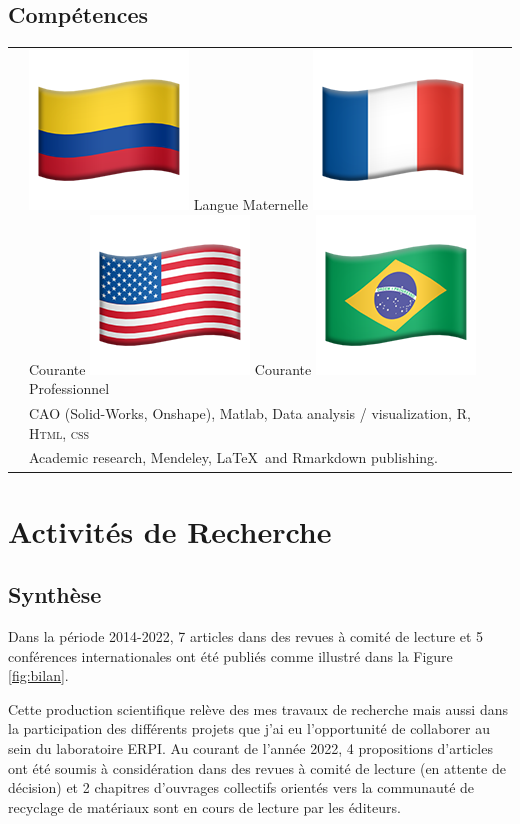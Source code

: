 \documentclass[
  12pt,
  oneside]{book}
\begin{document}
\hypertarget{compuxe9tences}{%
\section{Compétences}\label{compuxe9tences}}

\extrarowsep=3pt
\begin{tabu} to \linewidth {X[0.1,l] X[2,l]}

  & 
\includegraphics[width=2ex]{Figures/icons/flag-colombia.png} Langue Maternelle\quad 
\includegraphics[width=2ex]{Figures/icons/flag-france.png} Courante  \quad\includegraphics[width=2ex]{Figures/icons/flag-usa.png} Courante  \quad
\includegraphics[width=2ex]{Figures/icons/flag-brazil.png} Professionnel \\[5pt] 


  & CAO (Solid-Works, Onshape), Matlab,  Data analysis / visualization, R, \textsc{Html, css} \\[5pt]
    

  & Academic research,  Mendeley, \LaTeX ~and Rmarkdown publishing.

\end{tabu}

\hypertarget{activituxe9s-de-recherche}{%
\chapter{Activités de Recherche}\label{activituxe9s-de-recherche}}

\hypertarget{synthuxe8se}{%
\section{Synthèse}\label{synthuxe8se}}

Dans la période 2014-2022, 7 articles dans des revues à comité de lecture et 5 conférences internationales ont été publiés comme illustré dans la Figure \ref{fig:bilan}.

Cette production scientifique relève des mes travaux de recherche mais aussi dans la participation des différents projets que j'ai eu l'opportunité de collaborer au sein du laboratoire ERPI.
Au courant de l'année 2022, 4 propositions d'articles ont été soumis à considération dans des revues à comité de lecture (en attente de décision) et 2 chapitres d'ouvrages collectifs orientés vers la communauté de recyclage de matériaux sont en cours de lecture par les éditeurs.
\end{document}

